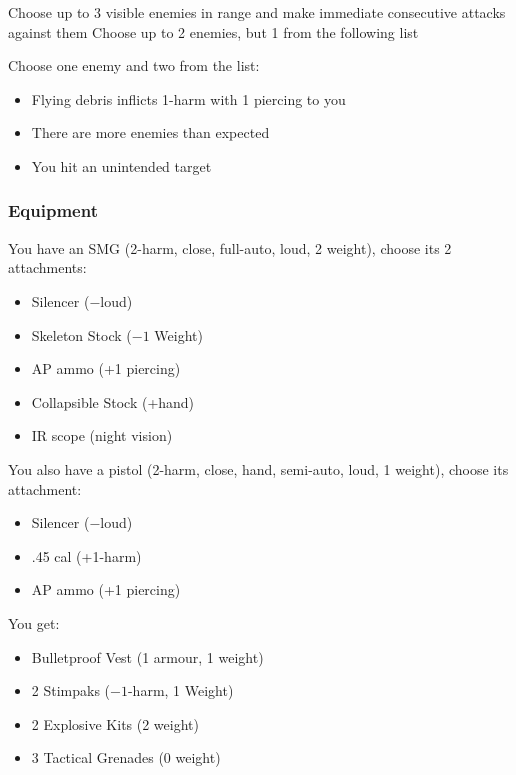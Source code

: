{Choose up to 3 visible enemies in range and make immediate consecutive attacks against them}
{Choose up to 2 enemies, but 1 from the following list}
{Choose one enemy and two from the list:
\begin{itemize}
\item Flying debris inflicts 1-harm with 1 piercing to you
\item There are more enemies than expected
\item You hit an unintended target
\end{itemize}}

\subsubsection{Equipment}
You have an SMG (2-harm, close, full-auto, loud, 2 weight), choose its 2 attachments:
\begin{itemize}
\item Silencer ($-$loud)
\item Skeleton Stock ($-1$ Weight)
\item AP ammo (+1 piercing)
\item Collapsible Stock (+hand)
\item IR scope (night vision)
\end{itemize}

You also have a pistol (2-harm, close, hand, semi-auto, loud, 1 weight), choose its attachment:
\begin{itemize}
\item Silencer ($-$loud)
\item .45 cal (+1-harm)
\item AP ammo (+1 piercing)
\end{itemize}

You get:
\begin{itemize}
\item Bulletproof Vest (1 armour, 1 weight)
\item 2 Stimpaks ($-1$-harm, 1 Weight)
\item 2 Explosive Kits (2 weight)
\item 3 Tactical Grenades (0 weight)
\end{itemize}

